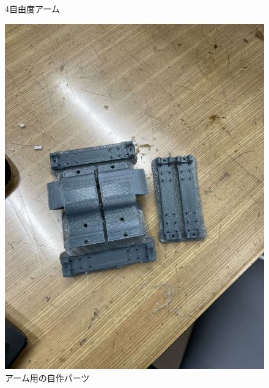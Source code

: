 \documentclass[10pt, oneside, titlepage]{ltjarticle}  %
\begin{document}
\begin{figure}[H]
\begin{minipage}{0.48\textwidth}
      \caption{4自由度アーム}
      \label{arm}
    \end{minipage}
    \hfill
    \begin{minipage}{0.48\textwidth}
      \centering
      \includegraphics[width=\textwidth]{figures/armparts.jpg}
      \caption{アーム用の自作パーツ}
      \label{armparts}
    \end{minipage}
  \end{figure}
\end{document}
